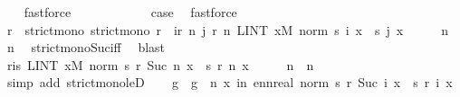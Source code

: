 \begin{isabellebody}
\ {\isacharasterisk}{\kern0pt}\ \isamarkupfalse%
\ fastforce\isanewline
\ \ \ \ \isacommand{{\isacharbraceright}{\kern0pt}}\isamarkupfalse%
\isanewline
\ \ \ \ \isamarkupfalse%
\ \isamarkupfalse%
\ {\isacharquery}{\kern0pt}case\ \isamarkupfalse%
\ fastforce\isanewline
\ \ \isamarkupfalse%
\isanewline
\ \ \isamarkupfalse%
\ \isamarkupfalse%
\ r\ \ strict{\isacharunderscore}{\kern0pt}mono{\isacharcolon}{\kern0pt}\ {\isachardoublequoteopen}strict{\isacharunderscore}{\kern0pt}mono\ r{\isachardoublequoteclose}\ \ {\isachardoublequoteopen}{\isasymforall}i{\isasymge}r\ n{\isachardot}{\kern0pt}\ {\isasymforall}j{\isasymge}\ r\ n{\isachardot}{\kern0pt}\ LINT\ x{\isacharbar}{\kern0pt}M{\isachardot}{\kern0pt}\ norm\ {\isacharparenleft}{\kern0pt}s\ i\ x\ {\isacharminus}{\kern0pt}\ s\ j\ x{\isacharparenright}{\kern0pt}\ {\isacharless}{\kern0pt}\ {\isacharparenleft}{\kern0pt}{}\ {\isacharslash}{\kern0pt}\ {}{\isacharparenright}{\kern0pt}\ {\isacharcircum}{\kern0pt}\ n{\isachardoublequoteclose}\ \ n\ \isamarkupfalse%
\ strict{\isacharunderscore}{\kern0pt}mono{\isacharunderscore}{\kern0pt}Suc{\isacharunderscore}{\kern0pt}iff\ \isamarkupfalse%
\ blast\isanewline
\ \ \isamarkupfalse%
\ r{\isacharunderscore}{\kern0pt}is{\isacharcolon}{\kern0pt}\ {\isachardoublequoteopen}LINT\ x{\isacharbar}{\kern0pt}M{\isachardot}{\kern0pt}\ norm\ {\isacharparenleft}{\kern0pt}s\ {\isacharparenleft}{\kern0pt}r\ {\isacharparenleft}{\kern0pt}Suc\ n{\isacharparenright}{\kern0pt}{\isacharparenright}{\kern0pt}\ x\ {\isacharminus}{\kern0pt}\ s\ {\isacharparenleft}{\kern0pt}r\ n{\isacharparenright}{\kern0pt}\ x{\isacharparenright}{\kern0pt}\ {\isacharless}{\kern0pt}\ {\isacharparenleft}{\kern0pt}{}\ {\isacharslash}{\kern0pt}\ {}{\isacharparenright}{\kern0pt}\ {\isacharcircum}{\kern0pt}\ n{\isachardoublequoteclose}\ \ n\ \isamarkupfalse%
\ {\isacharparenleft}{\kern0pt}simp\ add{\isacharcolon}{\kern0pt}\ strict{\isacharunderscore}{\kern0pt}mono{\isacharunderscore}{\kern0pt}leD{\isacharparenright}{\kern0pt}\isanewline
\isanewline
\ \ \isamarkupfalse%
\ g\ \ {\isachardoublequoteopen}g\ {\isacharequal}{\kern0pt}\ {\isacharparenleft}{\kern0pt}{\isasymlambda}n\ x{\isachardot}{\kern0pt}\ {\isacharparenleft}{\kern0pt}{\isasymSum}i{\isasymle}n{\isachardot}{\kern0pt}\ ennreal\ {\isacharparenleft}{\kern0pt}norm\ {\isacharparenleft}{\kern0pt}s\ {\isacharparenleft}{\kern0pt}r\ {\isacharparenleft}{\kern0pt}Suc\ i{\isacharparenright}{\kern0pt}{\isacharparenright}{\kern0pt}\ x\ {\isacharminus}{\kern0pt}\ s\ {\isacharparenleft}{\kern0pt}r\ i{\isacharparenright}{\kern0pt}\ x{\isacharparenright}{\kern0pt}{\isacharparenright}{\kern0pt}{\isacharparenright}{\kern0pt}{\isacharparenright}{\kern0pt}{\isachardoublequoteclose}\isanewline

\end{isabellebody}
